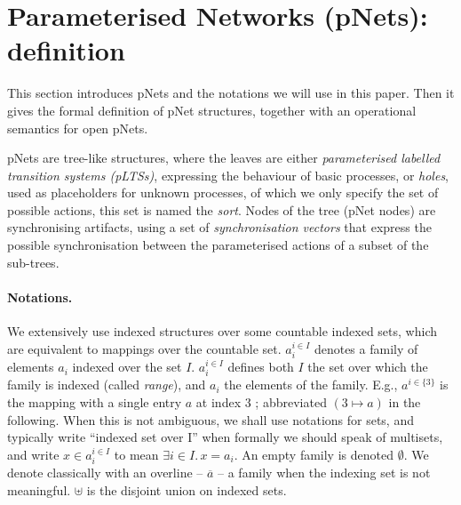 \documentclass{lncs/llncs}
\newcommand{\LUDO}[1]{\textcolor{darkgreen}{#1}}
\begin{document}
\section{Parameterised Networks (pNets): definition}
\label{section:pnets}

This section introduces pNets and the notations we will use in
this paper. Then it gives the formal definition of pNet structures,
together with an operational semantics for open pNets.

pNets are tree-like structures, where the leaves are either
\emph{parameterised labelled transition systems (pLTSs)}, expressing the
behaviour of basic processes, or \emph{holes}, used as placeholders
for unknown processes, of which we only specify the set of possible
actions, this set is named the \emph{sort}.
Nodes of the tree (pNet nodes) are synchronising artifacts, using a
set of \emph{synchronisation vectors} that express the possible
synchronisation between the parameterised actions of a subset of the
sub-trees.


\paragraph*{Notations.}
We extensively use indexed structures
over some countable indexed sets, which are equivalent to mappings over
the countable set. %
$a_i^{i\in I}$
denotes a family of elements $a_i$ indexed over the
set $I$. %
$a_i^{i\in I}$ defines both $I$ the set over which the family is
indexed (called \emph{range}), and $a_i$ the elements of the family.
E.g., $a^{i\in\{3\}}$ is the mapping with a single entry $a$ at index
$3$ ; abbreviated $(3\mapsto a)$ in the following.
When this is not
ambiguous, we shall use notations for sets, and typically write
``indexed set over I'' when formally we should speak of multisets, and
write $x\in a_i^{i\in I}$ to mean $\exists i\in I.\, x=a_i$.  An empty
family is denoted $\emptyset$. We
denote classically with an overline -- $\overline{a}$  -- a family when the indexing set 
is
not meaningful.  $\uplus$ is the disjoint union on
indexed sets.
\end{document}
